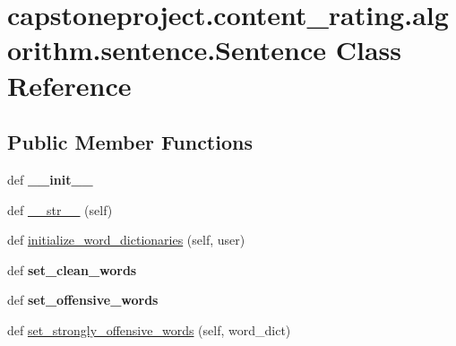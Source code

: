 \hypertarget{classcapstoneproject_1_1content__rating_1_1algorithm_1_1sentence_1_1_sentence}{}\section{capstoneproject.\+content\+\_\+rating.\+algorithm.\+sentence.\+Sentence Class Reference}
\label{classcapstoneproject_1_1content__rating_1_1algorithm_1_1sentence_1_1_sentence}
\subsection*{Public Member Functions}
\begin{DoxyCompactItemize}
\item 
\mbox{\label{classcapstoneproject_1_1content__rating_1_1algorithm_1_1sentence_1_1_sentence_ad879f2b6e67712859a03090e2d1119e5}} 
def {\bfseries \+\_\+\+\_\+init\+\_\+\+\_\+}
\item 
def \mbox{\hyperlink{classcapstoneproject_1_1content__rating_1_1algorithm_1_1sentence_1_1_sentence_aa9e766f5bd2010875c1bf52ad23586ad}{\+\_\+\+\_\+str\+\_\+\+\_\+}} (self)
\item 
def \mbox{\hyperlink{classcapstoneproject_1_1content__rating_1_1algorithm_1_1sentence_1_1_sentence_a555042b237e1e07d7fc20adfbccffa9e}{initialize\+\_\+word\+\_\+dictionaries}} (self, user)
\item 
\mbox{\label{classcapstoneproject_1_1content__rating_1_1algorithm_1_1sentence_1_1_sentence_a64e2a995f6d4508ca73b414398545c22}} 
def {\bfseries set\+\_\+clean\+\_\+words}
\item 
\mbox{\label{classcapstoneproject_1_1content__rating_1_1algorithm_1_1sentence_1_1_sentence_a74d6dfad055699542ce33c5fdd5b40d9}} 
def {\bfseries set\+\_\+offensive\+\_\+words}
\item 
def \mbox{\hyperlink{classcapstoneproject_1_1content__rating_1_1algorithm_1_1sentence_1_1_sentence_ad3a2d4dd90adf7df23aadb2bbc020862}{set\+\_\+strongly\+\_\+offensive\+\_\+words}} (self, word\+\_\+dict)
\item 

\end{DoxyCompactItemize}
